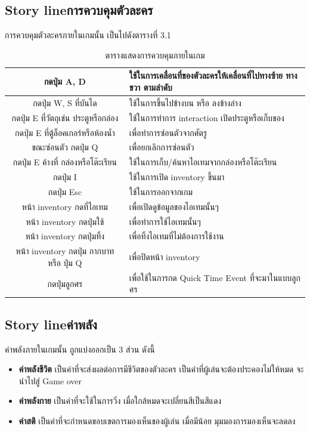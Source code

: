 \newpage
\subsection{\ifenglish Story line\else การควบคุมตัวละคร\fi }
การควบคุมตัวละครภายในเกมนั้น เป็นไปดังตารางที่ 3.1
\begin{table}[h]
    \centering
    \begin{tabular}[t]{|c|p{8cm}|}
    \hline
    กดปุ่ม A, D & ใช้ในการเคลื่อนที่ของตัวละครให้เคลื่อนที่ไปทางซ้าย ทางขวา ตามลำดับ\\
    \hline
    กดปุ่ม W, S ที่บันได& ใช้ในการขึ้นไปข้างบน หรือ ลงข้างล่าง\\
    \hline
    กดปุ่ม E ที่วัตถุเช่น ประตูหรือกล่อง& ใช้ในการทำการ interaction เปิดประตูหรือเก็บของ\\
    \hline
    กดปุ่ม E ที่ตู้ล็อคเกอร์หรือห้องน้ำ& เพื่อทำการซ่อนตัวจากศัตรู\\
    \hline
    ขณะซ่อนตัว กดปุ่ม Q& เพื่อยกเลิกการซ่อนตัว\\
    \hline
    กดปุ่ม E ค้างที่ กล่องหรือโต๊ะเรียน & ใช้ในการเก็บ/ค้นหาไอเทมจากกล่องหรือโต๊ะเรียน\\
    \hline
    กดปุ่ม I & ใช้ในการเปิด inventory ขึ้นมา\\
    \hline
    กดปุ่ม Esc& ใช้ในการออกจากเกม\\
    \hline
    หน้า inventory กดที่ไอเทม& เพื่อเปิดดูข้อมูลของไอเทมนั้นๆ\\
    \hline
    หน้า inventory กดปุ่มใช้& เพื่อทำการใช้ไอเทมนั้นๆ\\
    \hline
    หน้า inventory กดปุ่มทิ้ง& เพื่อทิ้งไอเทมที่ไม่ต้องการใช้งาน\\
    \hline
    หน้า inventory กดปุ่ม กากบาท หรือ ปุ่ม Q& เพื่อปิดหน้า inventory\\
    \hline
    กดปุ่มลูกศร& เพื่อใช้ในการกด Quick Time Event ที่จะมาในแบบลูกศร\\
    \hline
    \end{tabular}
    \caption[ตารางแสดงการควบคุมภายในเกม]{ตารางแสดงการควบคุมภายในเกม}
\end{table}

\subsection{\ifenglish Story line\else ค่าพลัง\fi }
ค่าพลังภายในเกมนั้น ถูกแบ่งออกเป็น 3 ส่วน ดังนี้
\begin{itemize}
    \item \textbf{ค่าพลังชีวิต} เป็นค่าที่จะส่งผลต่อการมีชีวิตของตัวละคร เป็นค่าที่ผู้เล่นจะต้องประคองไม่ให้หมด จะนำไปสู่ Game over
    \item \textbf{ค่าพลังกาย} เป็นค่าที่จะใช้ในการวิ่ง เมื่อใกล้หมดจะเปลี่ยนสีเป็นสีแดง
    \item \textbf{ค่าสติ} เป็นค่าที่จะกำหนดขอบเขตการมองเห็นของผู้เล่น เมื่อมีน้อย มุมมองการมองเห็นจะลดลง
\end{itemize}
